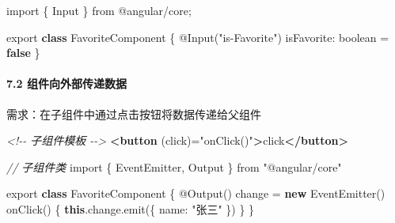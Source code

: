 \documentclass[
]{article}
\newenvironment{Shaded}{}{}
\newcommand{\AttributeTok}[1]{\textcolor[rgb]{0.49,0.56,0.16}{#1}}
\newcommand{\BuiltInTok}[1]{#1}
\newcommand{\CommentTok}[1]{\textcolor[rgb]{0.38,0.63,0.69}{\textit{#1}}}
\newcommand{\DataTypeTok}[1]{\textcolor[rgb]{0.56,0.13,0.00}{#1}}
\newcommand{\FunctionTok}[1]{\textcolor[rgb]{0.02,0.16,0.49}{#1}}
\newcommand{\ImportTok}[1]{#1}
\newcommand{\KeywordTok}[1]{\textcolor[rgb]{0.00,0.44,0.13}{\textbf{#1}}}
\newcommand{\NormalTok}[1]{#1}
\newcommand{\OperatorTok}[1]{\textcolor[rgb]{0.40,0.40,0.40}{#1}}
\newcommand{\OtherTok}[1]{\textcolor[rgb]{0.00,0.44,0.13}{#1}}
\newcommand{\StringTok}[1]{\textcolor[rgb]{0.25,0.44,0.63}{#1}}
\begin{document}
\begin{Shaded}
\begin{Highlighting}[]
\ImportTok{import}\NormalTok{ \{ Input \} }\ImportTok{from} \StringTok{\textquotesingle{}@angular/core\textquotesingle{}}\OperatorTok{;}

\ImportTok{export} \KeywordTok{class}\NormalTok{ FavoriteComponent \{}
\NormalTok{  @}\FunctionTok{Input}\NormalTok{(}\StringTok{"is{-}Favorite"}\NormalTok{) }\DataTypeTok{isFavorite}\OperatorTok{:}\NormalTok{ boolean }\OperatorTok{=} \KeywordTok{false}
\NormalTok{\}}
\end{Highlighting}
\end{Shaded}

\hypertarget{72-ux7ec4ux4ef6ux5411ux5916ux90e8ux4f20ux9012ux6570ux636e}{%
\paragraph{7.2
组件向外部传递数据}\label{72-ux7ec4ux4ef6ux5411ux5916ux90e8ux4f20ux9012ux6570ux636e}}

需求：在子组件中通过点击按钮将数据传递给父组件

\begin{Shaded}
\begin{Highlighting}[]
\CommentTok{\textless{}!{-}{-} 子组件模板 {-}{-}\textgreater{}}
\KeywordTok{\textless{}button}\OtherTok{ (click)=}\StringTok{"onClick()"}\KeywordTok{\textgreater{}}\NormalTok{click}\KeywordTok{\textless{}/button\textgreater{}}
\end{Highlighting}
\end{Shaded}

\begin{Shaded}
\begin{Highlighting}[]
\CommentTok{// 子组件类}
\ImportTok{import}\NormalTok{ \{ }\BuiltInTok{EventEmitter}\OperatorTok{,}\NormalTok{ Output \} }\ImportTok{from} \StringTok{"@angular/core"}

\ImportTok{export} \KeywordTok{class}\NormalTok{ FavoriteComponent \{}
\NormalTok{  @}\FunctionTok{Output}\NormalTok{() change }\OperatorTok{=} \KeywordTok{new} \BuiltInTok{EventEmitter}\NormalTok{()}
  \FunctionTok{onClick}\NormalTok{() \{}
    \KeywordTok{this}\OperatorTok{.}\AttributeTok{change}\OperatorTok{.}\FunctionTok{emit}\NormalTok{(\{ }\DataTypeTok{name}\OperatorTok{:} \StringTok{"张三"}\NormalTok{ \})}
\NormalTok{  \}}
\NormalTok{\}}
\end{Highlighting}
\end{Shaded}
\end{document}
